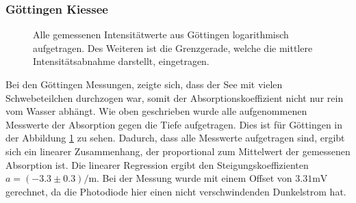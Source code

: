 \documentclass[12pt,a4paper,titlepage,headinclude,bibtotoc]{scrartcl}
\numberwithin{equation}{subsection}
\begin{document}
\subsubsection{Göttingen Kiessee}
\begin{figure}[!htb]
	\centering
	
	\caption{Alle gemessenen Intensitätwerte aus Göttingen logarithmisch aufgetragen. Des Weiteren ist die Grenzgerade, welche die mittlere Intensitätsabnahme darstellt, eingetragen.}
	\label{fig:lichtGoe}
\end{figure}
Bei den Göttingen Messungen, zeigte sich, dass der See mit vielen Schwebeteilchen durchzogen war, somit der Absorptionskoeffizient nicht nur rein vom Wasser abhängt.
Wie oben geschrieben wurde alle aufgenommenen Messwerte der Absorption gegen die Tiefe aufgetragen.
Dies ist für Göttingen in der Abbildung \ref{fig:lichtGoe} zu sehen.
Dadurch, dass alle Messwerte aufgetragen sind, ergibt sich ein linearer Zusammenhang, der proportional zum Mittelwert der gemessenen Absorption ist.
Die linearer Regression ergibt den Steigungskoeffizienten $a=(-3.3\pm0.3)\si{\per\meter}$.
Bei der Messung wurde mit einem Offset von $3.31\si{\milli\volt}$ gerechnet, da die Photodiode hier einen nicht verschwindenden Dunkelstrom hat.
\end{document}
